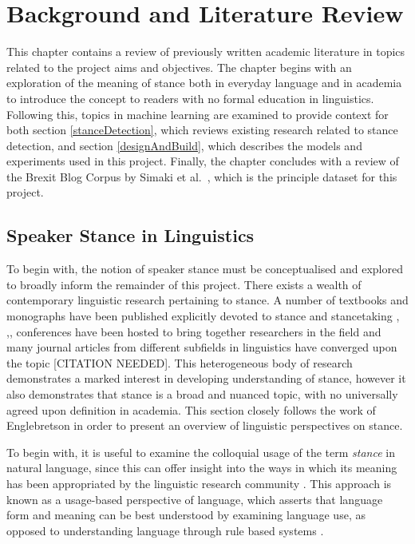 \documentclass[Dissertation.tex]{subfiles}
\begin{document}
\chapter{Background and Literature Review}
This chapter contains a review of previously written academic literature in topics related to the project aims and objectives. The chapter begins with an exploration of the meaning of stance both in everyday language and in academia to introduce the concept to readers with no formal education in linguistics.  Following this, topics in machine learning are examined to provide context for both section \ref{stanceDetection}, which reviews existing research related to stance detection, and section \ref{designAndBuild}, which describes the models and experiments used in this project. Finally, the chapter concludes with a review of the Brexit Blog Corpus by Simaki et al.\ \cite{simakiAnnotatingSpeakerStance2017}, which is the principle dataset for this project.
 
\section{Speaker Stance in Linguistics}\label{sec:speakerStanceLing}
To begin with, the notion of speaker stance must be conceptualised and explored to broadly inform the remainder of this project. There exists a wealth of contemporary linguistic research pertaining to stance. A number of textbooks and monographs have been published explicitly devoted to stance and stancetaking
\cite{hunstonEvaluationTextAuthorial2000}, \cite{englebretsonStancetakingDiscourseSubjectivity2007},\cite{karkkainenEpistemicStanceEnglish2003}, 
%
conferences have been hosted to bring together researchers in the field
%
%
and  many journal articles from different subfields in linguistics have converged upon the topic [CITATION NEEDED]. This heterogeneous body of research demonstrates a marked interest in developing understanding of stance, however it also demonstrates that stance is a broad and nuanced topic, with no universally agreed upon definition in academia. This section closely follows the work of Englebretson \cite{englebretsonStancetakingDiscourseSubjectivity2007} in order to present an overview of linguistic perspectives on stance.

To begin with, it is useful to examine the colloquial usage of the term \textit{stance} in natural language, since this can offer insight into the ways in which its meaning has been appropriated by the linguistic research community \cite{englebretsonStancetakingDiscourseSubjectivity2007}. This approach is known as a usage-based perspective of language, which asserts that language form and meaning can be best understood by examining language use, as opposed to understanding language through rule based systems \cite{barlowUsagebasedModelsLanguage2000}. 
\end{document}
